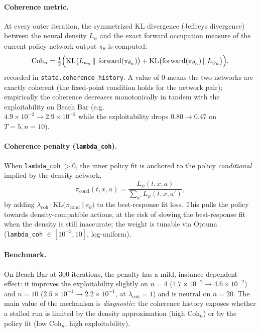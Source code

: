 \documentclass[11pt,a4paper]{article}
\begin{document}
\paragraph{Coherence metric.} At every outer iteration, the symmetrized KL
divergence (Jeffreys divergence) between the neural density $L_\psi$ and the
exact forward occupation measure of the current policy-network output
$\pi_\theta$ is computed:
\begin{equation}
  \mathrm{Coh}_n = \tfrac{1}{2}\Bigl(
    \mathrm{KL}\bigl(L_{\psi_n} \,\Vert\, \operatorname{forward}(\pi_{\theta_n})\bigr)
    + \mathrm{KL}\bigl(\operatorname{forward}(\pi_{\theta_n}) \,\Vert\, L_{\psi_n}\bigr)
  \Bigr),
\end{equation}
recorded in \texttt{state.coherence\_history}. A value of $0$ means the two
networks are exactly coherent (the fixed-point condition holds for the
network pair); empirically the coherence decreases monotonically in tandem
with the exploitability on Beach Bar (e.g.\\ $4.9 \times 10^{-2} \to
2.9 \times 10^{-2}$ while the exploitability drops $0.80 \to 0.47$ on
$T{=}5, n{=}10$).

\paragraph{Coherence penalty (\texttt{lambda\_coh}).} When
\texttt{lambda\_coh} $> 0$, the inner policy fit is anchored to the policy
\emph{conditional} implied by the density network,
\begin{equation}
  \pi_{\mathrm{cond}}(t, x, a) = \frac{L_\psi(t, x, a)}{\sum_{a'} L_\psi(t, x, a')},
\end{equation}
by adding $\lambda_{\mathrm{coh}} \cdot
\mathrm{KL}\bigl(\pi_{\mathrm{cond}} \,\Vert\, \pi_\theta\bigr)$ to the
best-response fit loss. This pulls the policy towards density-compatible
actions, at the risk of slowing the best-response fit when the density is
still inaccurate; the weight is tunable via Optuna
(\texttt{lambda\_coh} $\in [10^{-3}, 10]$, log-uniform).

\paragraph{Benchmark.} On Beach Bar at 300 iterations, the penalty has a
mild, instance-dependent effect: it improves the exploitability slightly on
$n{=}4$ ($4.7 \times 10^{-2} \to 4.6 \times 10^{-2}$) and $n{=}10$
($2.5 \times 10^{-1} \to 2.2 \times 10^{-1}$, at $\lambda_{\mathrm{coh}}{=}1$)
and is neutral on $n{=}20$. The main value of the mechanism is
\emph{diagnostic}: the coherence history exposes whether a stalled run is
limited by the density approximation (high $\mathrm{Coh}_n$) or by the policy
fit (low $\mathrm{Coh}_n$, high exploitability).
\end{document}
